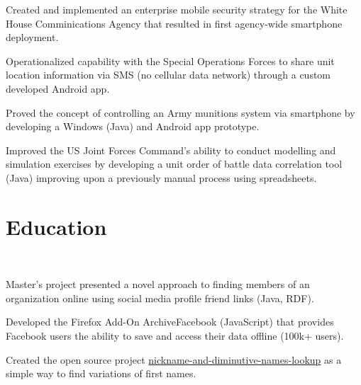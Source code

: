 \documentclass[]{deedy-resume-openfont}
\begin{document}
\sectionsep
{}\hfill {}
\begin{tightemize}
	\item Created and implemented an enterprise mobile security strategy for the White House Comminications Agency that resulted in first agency-wide smartphone deployment.
	\item Operationalized capability with the Special Operations Forces to share unit location information via SMS (no cellular data network) through a custom developed Android app.
	\item Proved the concept of controlling an Army munitions system via smartphone by developing a Windows (Java) and Android app prototype.
\end{tightemize}
\sectionsep
{}\hfill {}
\begin{tightemize}
	\item Improved the US Joint Forces Command's ability to conduct modelling and simulation exercises by developing a unit order of battle data correlation tool (Java) improving upon a previously manual process using spreadsheets.
\end{tightemize}
\sectionsep


%
%
\section{Education}
\raggedright

\hfill {}\\
\begin{tightemize}
	\item Master's project presented a novel approach to finding members of an organization online using social media profile friend links (Java, RDF).
\end{tightemize}
\sectionsep
{}\hfill {}
\begin{tightemize}
	\item Developed the Firefox Add-On ArchiveFacebook (JavaScript) that provides Facebook users the ability to save and access their data offline (100k+ users).
	\item Created the open source project \href{https://github.com/carltonnorthern/nickname-and-diminutive-names-lookup}{nickname-and-diminutive-names-lookup} as a simple way to find variations of first names.
\end{tightemize}
\sectionsep
\end{document}
